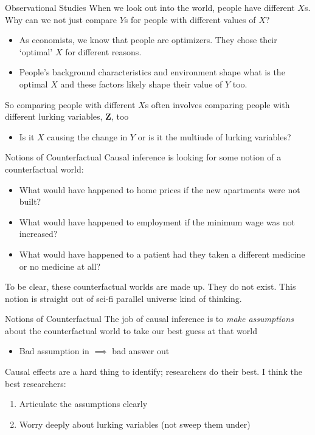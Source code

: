 \documentclass[aspectratio=169,t,11pt,table]{beamer}
\begin{document}
\begin{frame}{Observational Studies}
  When we look out into the world, people have different $X$s. Why can we not just compare $Y$s for people with different values of $X$? 
  
  \begin{itemize}
    \item As economists, we know that people are optimizers. They chose their `optimal' $X$ for different reasons. 
    
    \item People's background characteristics and environment shape what is the optimal $X$ and these factors likely shape their value of $Y$ too.
  \end{itemize}

  \pause
  \bigskip
  So comparing people with different $X$s often involves comparing people with different lurking variables, $\bm{Z}$, too
  \begin{itemize}
    \item Is it $X$ causing the change in $Y$ or is it the multiude of lurking variables?
  \end{itemize}
\end{frame}

\begin{frame}{Notions of Counterfactual}
  Causal inference is looking for some notion of a \alert{counterfactual} world:
  \begin{itemize}
    \item What would have happened to home prices if the new apartments were not built? 
    
    \item What would have happened to employment if the minimum wage was not increased? 
    
    \item What would have happened to a patient had they taken a different medicine or no medicine at all?
  \end{itemize}

  To be clear, these counterfactual worlds are \alert{made up}. They do not exist. This notion is straight out of sci-fi parallel universe kind of thinking.
\end{frame}

\begin{frame}{Notions of Counterfactual}
  The job of causal inference is to \emph{make assumptions} about the counterfactual world to take our best guess at that world
  \begin{itemize}
    \item Bad assumption in $\implies$ bad answer out
  \end{itemize}

  \bigskip
  Causal effects are a hard thing to identify; researchers do their best. I think the best researchers:
  \begin{enumerate}
    \item Articulate the assumptions clearly
    
    \item Worry deeply about lurking variables (not sweep them under)
  \end{enumerate}
\end{frame}
\end{document}
